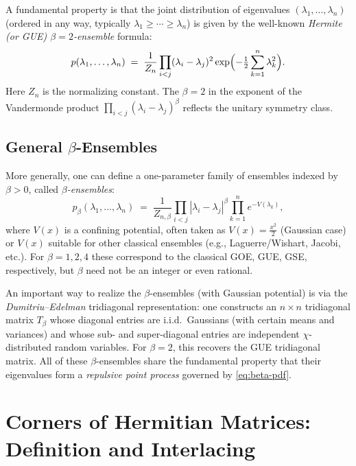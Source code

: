 \documentclass[letterpaper,11pt,oneside,reqno]{article}
\numberwithin{equation}{section}
\theoremstyle{definition}
\begin{document}
A fundamental property is that the joint distribution of eigenvalues $(\lambda_1,\dots,\lambda_n)$ (ordered in any way, typically $\lambda_1\ge \cdots \ge \lambda_n$) is given by the well-known \emph{Hermite (or GUE) $\beta=2$-ensemble} formula:
\begin{equation}\label{eq:gue-eig-pdf}
	p(\lambda_1,\dots,\lambda_n)
	\;=\;\frac{1}{Z_{n}}
	\prod_{i<j}(\lambda_i-\lambda_j)^2
	\exp\Bigl(-\tfrac{1}{2}\sum_{k=1}^n\lambda_k^2\Bigr).
\end{equation}
Here $Z_n$ is the normalizing constant. The $\beta=2$ in the exponent of the Vandermonde product $\prod_{i<j}(\lambda_i-\lambda_j)^\beta$ reflects the unitary symmetry class.

\subsection{General $\beta$-Ensembles}
\label{sec:beta-ensembles}
More generally, one can define a one-parameter family of ensembles indexed by $\beta>0$, called \emph{$\beta$-ensembles}:
\begin{equation}\label{eq:beta-pdf}
	p_\beta(\lambda_1,\dots,\lambda_n)
	\;=\;\frac{1}{Z_{n,\beta}}
	\prod_{i<j}\!|\lambda_i-\lambda_j|^\beta
	\prod_{k=1}^n e^{-V(\lambda_k)},
\end{equation}
where $V(x)$ is a confining potential, often taken as $V(x)=\tfrac{x^2}{2}$ (Gaussian case) or $V(x)$ suitable for other classical ensembles (e.g., Laguerre/Wishart, Jacobi, etc.). For $\beta=1,2,4$ these correspond to the classical GOE, GUE, GSE, respectively, but $\beta$ need not be an integer or even rational.

An important way to realize the $\beta$-ensembles (with Gaussian potential) is via the \emph{Dumitriu--Edelman} tridiagonal representation: one constructs an $n\times n$ tridiagonal matrix $T_\beta$ whose diagonal entries are i.i.d.\ Gaussians (with certain means and variances) and whose sub- and super-diagonal entries are independent $\chi$-distributed random variables. For $\beta=2$, this recovers the GUE tridiagonal matrix. All of these $\beta$-ensembles share the fundamental property that their eigenvalues form a \emph{repulsive point process} governed by \eqref{eq:beta-pdf}.

\section{Corners of Hermitian Matrices: Definition and Interlacing}
\label{sec:corners-definition}
\end{document}

